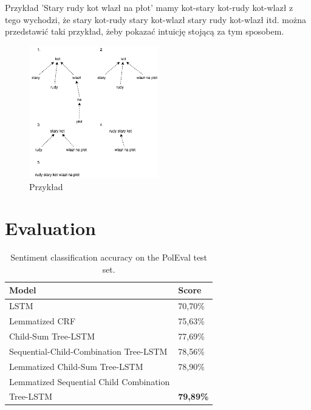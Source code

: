 \documentclass[10pt, a4paper]{article}
\begin{document}
Przykład 'Stary rudy kot wlazł na płot'
mamy kot-stary kot-rudy kot-wlazł
z tego wychodzi, że stary kot-rudy stary kot-wlazł
stary rudy kot-wlazł itd.
można przedstawić taki przykład, żeby pokazać intuicję stojącą za tym sposobem.
\begin{figure}[h]
	\begin{center}
		\includegraphics[width=0.5\textwidth]{staryrudykot}
		\caption{Przykład}
	\end{center}
\end{figure}
	
\section{Evaluation} 

\begin{table}[h]
 \begin{center}
\begin{tabular}{|l|l|}

      \hline
      Model & Score\\
      \hline
      LSTM &70,70\%\\
      \hline
      Lemmatized CRF & 75,63\%\\
      \hline
      Child-Sum Tree-LSTM &  77,69\%\\
      \hline
      Sequential-Child-Combination Tree-LSTM & 78,56\%\\
      \hline
      Lemmatized Child-Sum Tree-LSTM & 78,90\%\\
      \hline
      Lemmatized Sequential Child Combination & \\
      Tree-LSTM & \textbf{79,89\%} \\
      \hline
\end{tabular}
\caption{Sentiment classification accuracy on the PolEval test set.}
\label{tab:evaluation}
 \end{center}
\end{table}
\end{document}
